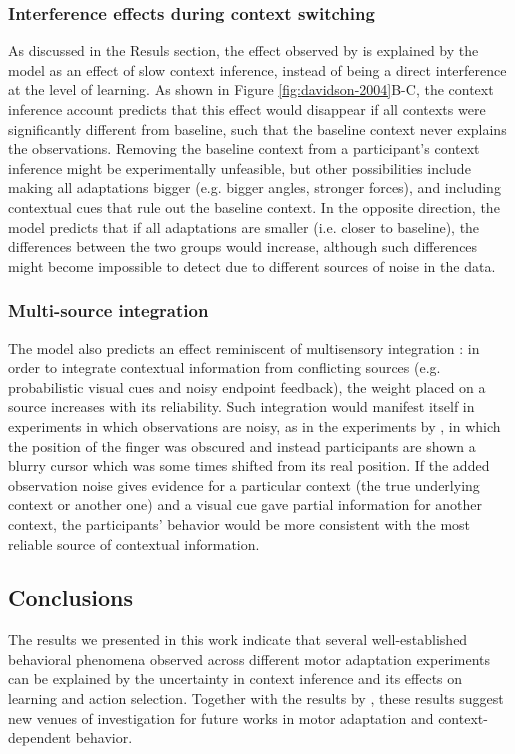 \documentclass[a4paper,doc,floatsintext,natbib]{apa6}
\def \fref #1{Figure \ref{#1}}     %
\begin{document}
\subsubsection{Interference effects during context switching}
As discussed in the Resuls section, the effect observed by \cite{Davidson_Scaling_2004} is explained by the model as an effect of slow context inference, instead of being a direct interference at the level of learning. As shown in \fref{fig:davidson-2004}B-C, the context inference account predicts that this effect would disappear if all contexts were significantly different from baseline, such that the baseline context never explains the observations. Removing the baseline context from a participant's context inference might be experimentally unfeasible, but other possibilities include making all adaptations bigger (e.g. bigger angles, stronger forces), and including contextual cues that rule out the baseline context. In the opposite direction, the model predicts that if all adaptations are smaller (i.e. closer to baseline), the differences between the two groups would increase, although such differences might become impossible to detect due to different sources of noise in the data.

\subsubsection{Multi-source integration}
The model also predicts an effect reminiscent of multisensory integration \citep{Ernst_Humans_2002}: in order to integrate contextual information from conflicting sources (e.g. probabilistic visual cues and noisy endpoint feedback), the weight placed on a source increases with its reliability. Such integration would manifest itself in experiments in which observations are noisy, as in the experiments by \cite{Kording_Bayesian_2004}, in which the position of the finger was obscured and instead participants are shown a blurry cursor which was some times shifted from its real position. If the added observation noise gives evidence for a particular context (the true underlying context or another one) and a visual cue gave partial information for another context, the participants' behavior would be more consistent with the most reliable source of contextual information.

\subsection{Conclusions}
The results we presented in this work indicate that several well-established behavioral phenomena observed across different motor adaptation experiments can be explained by the uncertainty in context inference and its effects on learning and action selection. Together with the results by \cite{Heald_Contextual_2021}, these results suggest new venues of investigation for future works in motor adaptation and context-dependent behavior.
\end{document}
